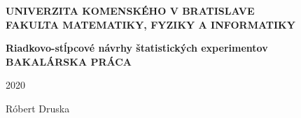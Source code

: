 \thispagestyle{empty}
\begin{center}
{\large \bf UNIVERZITA KOMENSKÉHO V BRATISLAVE \\
FAKULTA MATEMATIKY, FYZIKY A INFORMATIKY}
\end{center}
%

\vspace{2cm}
\begin{figure}[!h]
   \centering
\end{figure}

\vspace{1cm}
\begin{center}
{\large \bf Riadkovo-stĺpcové návrhy štatistických experimentov \\
\vspace{3cm}
BAKALÁRSKA PRÁCA}
\end{center}

\vfill
%
\begin{multicols}{2}
{\bf
\begin{flushleft} 2020 \end{flushleft}
\begin{flushright} Róbert Druska \end{flushright} 
}
\end{multicols}
